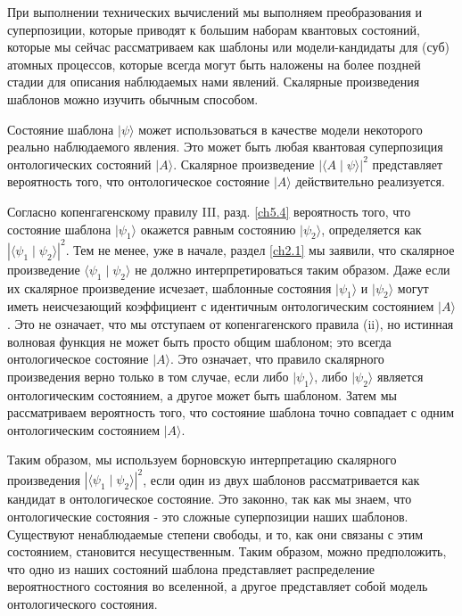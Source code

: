 \documentclass[main.tex]{subfiles}
\begin{document}
При выполнении технических вычислений мы выполняем преобразования и суперпозиции, которые приводят к большим наборам квантовых состояний, которые мы сейчас рассматриваем как шаблоны или модели-кандидаты для (суб) атомных процессов, которые всегда могут быть наложены на более поздней стадии для описания наблюдаемых нами явлений. Скалярные произведения шаблонов можно изучить обычным способом.

Состояние шаблона $\mid \psi \rangle$ может использоваться в качестве модели некоторого реально наблюдаемого явления. Это может быть любая квантовая суперпозиция онтологических состояний $\mid A \rangle$. Скалярное произведение $|\langle A \mid \psi \rangle|^2$ представляет вероятность того, что онтологическое состояние $\mid A \rangle$ действительно реализуется.

Согласно копенгагенскому правилу III, разд. \ref{ch5.4} вероятность того, что состояние шаблона $\mid \psi_1 \rangle$ окажется равным состоянию $\mid \psi_2 \rangle$, определяется как $|\langle \psi_1 \mid \psi_2 \rangle|^2$. Тем не менее, уже в начале, раздел \ref{ch2.1} мы заявили, что скалярное произведение $\langle \psi_1 \mid \psi_2 \rangle$ не должно интерпретироваться таким образом. Даже если их скалярное произведение исчезает, шаблонные состояния $\mid \psi_1 \rangle$ и $\mid \psi_2 \rangle$ могут иметь неисчезающий коэффициент с идентичным онтологическим состоянием $\mid A \rangle$. Это не означает, что мы отступаем от копенгагенского правила (ii), но истинная волновая функция не может быть просто общим шаблоном; это всегда онтологическое состояние $\mid A \rangle$. Это означает, что правило скалярного произведения верно только в том случае, если либо $\mid \psi_1 \rangle$, либо $\mid \psi_2 \rangle$ является онтологическим состоянием, а другое может быть шаблоном. Затем мы рассматриваем вероятность того, что состояние шаблона точно совпадает с одним онтологическим состоянием $\mid A \rangle$.

Таким образом, мы используем борновскую интерпретацию скалярного произведения $|\langle \psi_1 \mid \psi_2 \rangle|^2$, если один из двух шаблонов рассматривается как кандидат в онтологическое состояние. Это законно, так как мы знаем, что онтологические состояния - это сложные суперпозиции наших шаблонов. Существуют ненаблюдаемые степени свободы, и то, как они связаны с этим состоянием, становится несущественным. Таким образом, можно предположить, что одно из наших состояний шаблона представляет распределение вероятностного состояния во вселенной, а другое представляет собой модель онтологического состояния.
\end{document}
